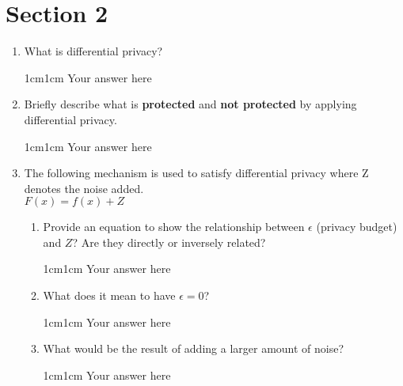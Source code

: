 \documentclass[11pt,letterpaper]{article}
\newenvironment{answer}{\em \color{blue} \begin{adjustwidth}{1cm}{1cm}}{\end{adjustwidth}}
\begin{document}
	\section*{Section 2}
	\begin{enumerate}
		
		\item What is differential privacy?
		
		\begin{answer}
			Your answer here
		\end{answer}
		
		\item Briefly describe what is \textbf{protected} and \textbf{not protected} by applying differential privacy.
		
		\begin{answer}
			Your answer here
		\end{answer}
		
		\item The following mechanism is used to satisfy differential privacy where Z denotes the noise added.\\
		\centering
		$F(x) = f(x) + Z $\\
		
		\vspace{0.25cm}
		\begin{enumerate}
			\item Provide an equation to show the relationship between $\epsilon$ (privacy budget) and $Z$? Are they directly or inversely related?
			\begin{answer}
				Your answer here
			\end{answer}
			
			\item What does it mean to have $\epsilon = 0$?
			\begin{answer}
				Your answer here
			\end{answer}
			
			\item What would be the result of adding a larger amount of noise?
			\begin{answer}
				Your answer here
			\end{answer}
		\end{enumerate}
		
	\end{enumerate}
	
\end{document}
